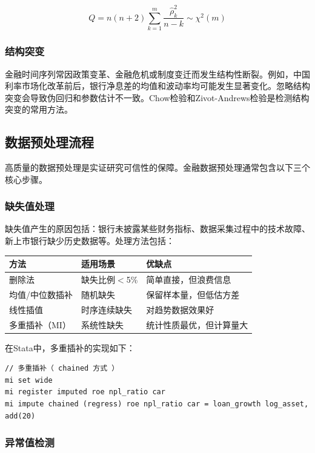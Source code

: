 \[
Q = n(n+2)\sum_{k=1}^{m}\frac{\hat{\rho}_k^2}{n-k} \sim \chi^2(m)
\]

\subsubsection{结构突变}

金融时间序列常因政策变革、金融危机或制度变迁而发生结构性断裂。例如，中国利率市场化改革前后，银行净息差的均值和波动率均可能发生显著变化。忽略结构突变会导致伪回归和参数估计不一致。Chow检验和Zivot-Andrews检验是检测结构突变的常用方法。

\subsection{数据预处理流程}

高质量的数据预处理是实证研究可信性的保障。金融数据预处理通常包含以下三个核心步骤。

\subsubsection{缺失值处理}

缺失值产生的原因包括：银行未披露某些财务指标、数据采集过程中的技术故障、新上市银行缺少历史数据等。处理方法包括：

\begin{table}[H]
\centering
\begin{tabular}{lp{4cm}p{5cm}}
\toprule
\textbf{方法} & \textbf{适用场景} & \textbf{优缺点} \\
\midrule
删除法 & 缺失比例$<$5\% & 简单直接，但浪费信息 \\
均值/中位数插补 & 随机缺失 & 保留样本量，但低估方差 \\
线性插值 & 时序连续缺失 & 对趋势数据效果好 \\
多重插补（MI） & 系统性缺失 & 统计性质最优，但计算量大 \\
\bottomrule
\end{tabular}
\end{table}

在Stata中，多重插补的实现如下：

\begin{lstlisting}[style=stata]
// 多重插补（ chained 方式 ）
mi set wide
mi register imputed roe npl_ratio car
mi impute chained (regress) roe npl_ratio car = loan_growth log_asset, add(20)
\end{lstlisting}

\subsubsection{异常值检测}

